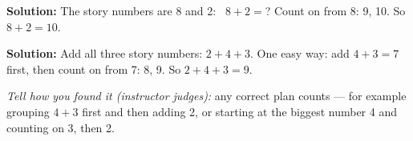 \documentclass[12pt]{article}
\begin{document}

\textbf{Solution:} The story numbers are 8 and 2: \ $8 + 2 = {}$? Count on
from 8: 9, 10. So $8 + 2 = 10$. 


\textbf{Solution:} Add all three story numbers: $2 + 4 + 3$. One easy way:
add $4 + 3 = 7$ first, then count on from 7: 8, 9. So $2 + 4 + 3 = 9$.

\emph{Tell how you found it (instructor judges):} any correct plan counts ---
for example grouping $4+3$ first and then adding 2, or starting at the
biggest number 4 and counting on 3, then 2.
\end{document}
